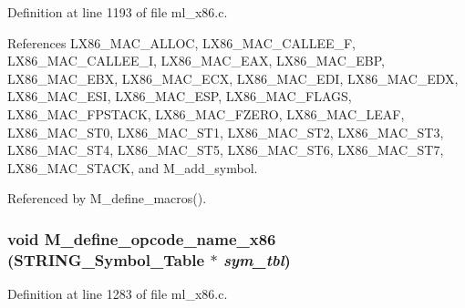 Definition at line 1193 of file ml\_\-x86.c.

References LX86\_\-MAC\_\-ALLOC, LX86\_\-MAC\_\-CALLEE\_\-F, LX86\_\-MAC\_\-CALLEE\_\-I, LX86\_\-MAC\_\-EAX, LX86\_\-MAC\_\-EBP, LX86\_\-MAC\_\-EBX, LX86\_\-MAC\_\-ECX, LX86\_\-MAC\_\-EDI, LX86\_\-MAC\_\-EDX, LX86\_\-MAC\_\-ESI, LX86\_\-MAC\_\-ESP, LX86\_\-MAC\_\-FLAGS, LX86\_\-MAC\_\-FPSTACK, LX86\_\-MAC\_\-FZERO, LX86\_\-MAC\_\-LEAF, LX86\_\-MAC\_\-ST0, LX86\_\-MAC\_\-ST1, LX86\_\-MAC\_\-ST2, LX86\_\-MAC\_\-ST3, LX86\_\-MAC\_\-ST4, LX86\_\-MAC\_\-ST5, LX86\_\-MAC\_\-ST6, LX86\_\-MAC\_\-ST7, LX86\_\-MAC\_\-STACK, and M\_\-add\_\-symbol.

Referenced by M\_\-define\_\-macros().
\subsubsection{\setlength{\rightskip}{0pt plus 5cm}void M\_\-define\_\-opcode\_\-name\_\-x86 (\bf{STRING\_\-Symbol\_\-Table} $\ast$ {\em sym\_\-tbl})}\label{m__x86_8h_e7257eb4b2496a55ddf175459e8ecda0}




Definition at line 1283 of file ml\_\-x86.c.

